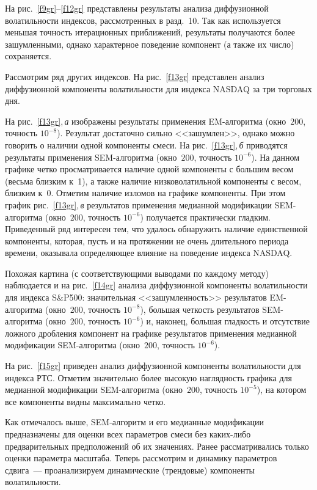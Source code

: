 \begin{multicols}{2}
На рис.~\ref{f9gr}--\ref{f12gr} представлены результаты анализа диффузионной
волатильности индексов, рас\-смот\-рен\-ных в разд.~10. Так как
используется меньшая точность итерационных приближений, результаты
получаются более зашумленными, однако характерное поведение компонент (а также их число) сохраняется.

Рассмотрим ряд других индексов. На рис.~\ref{f13gr} представлен анализ
диффузионной компоненты волатильности для индекса NASDAQ за три торговых дня.

На рис.~\ref{f13gr},\,\textit{а} изображены результаты применения EM-алгоритма
(окно~$200$, точность $10^{-8}$). Результат достаточно сильно
<<зашумлен>>, однако можно говорить о наличии одной компоненты
смеси. На рис.~\ref{f13gr},\,\textit{б} приводятся результаты применения
SEM-алгоритма (окно~$200$, точность $10^{-6}$). На данном графике
четко просматривается наличие одной компоненты с большим весом
(весьма близким к~1), а также наличие низковолатильной компоненты
с весом, близким к~0. Отметим наличие изломов на графике
компоненты. При этом график рис.~\ref{f13gr},\,\textit{в} результатов применения
медианной модификации SEM-алгоритма (окно~$200$, точность
$10^{-6}$) получается практически гладким. Приведенный ряд
интересен тем, что удалось обнаружить наличие единственной
компоненты, которая, пусть и на протяжении не очень длительного
периода времени, оказывала определяющее влияние на поведение
индекса NASDAQ.

Похожая картина (с соответствующими выводами по каждому методу)
наблюдается и на рис.~\ref{f14gr} анализа диффузионной компоненты
во\-ла\-тиль\-ности для индекса S\&P500: значительная <<зашумленность>>
результатов EM-алгоритма (окно~$200$, точность $10^{-8}$), большая
четкость результатов SEM-ал\-го\-рит\-ма (окно~$200$, точность
$10^{-6}$) и, наконец, большая гладкость и отсутствие ложного
дробления компонент на графике результатов применения медианной
модификации SEM-алгоритма (окно~$200$, точность $10^{-6}$).

На рис.~\ref{f15gr} приведен анализ диффузионной компоненты волатильности для
индекса РТС. Отметим значительно более высокую наглядность графика
для медианной модификации SEM-алгоритма (окно~$200$, точность
$10^{-5}$), на котором все компоненты видны максимально четко.

Как отмечалось выше, SEM-алгоритм и его медианные модификации
предназначены для оценки всех параметров смеси без каких-либо
предварительных предположений об их значениях. Ранее
рассматривались только оценки параметра масштаба. Теперь
рассмотрим и динамику параметров сдвига~--- проанализируем
динамические (трендовые) компоненты волатильности.


\end{multicols}
